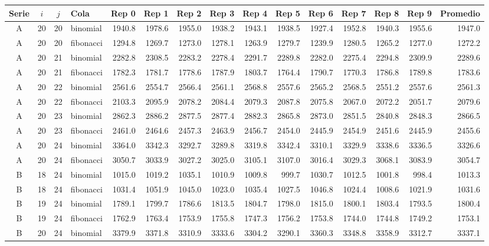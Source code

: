 \begin{tabular}{ccclrrrrrrrrrrr}
\hline
Serie & $i$ & $j$ & Cola & Rep 0 & Rep 1 & Rep 2 & Rep 3 & Rep 4 & Rep 5 & Rep 6 & Rep 7 & Rep 8 & Rep 9 & Promedio \\
\hline
A & 20 & 20 & binomial & 1940.8 & 1978.6 & 1955.0 & 1938.2 & 1943.1 & 1938.5 & 1927.4 & 1952.8 & 1940.3 & 1955.6 & 1947.0 \\
A & 20 & 20 & fibonacci & 1294.8 & 1269.7 & 1273.0 & 1278.1 & 1263.9 & 1279.7 & 1239.9 & 1280.5 & 1265.2 & 1277.0 & 1272.2 \\
A & 20 & 21 & binomial & 2282.8 & 2308.5 & 2283.2 & 2278.4 & 2291.7 & 2289.8 & 2282.0 & 2275.4 & 2294.8 & 2309.9 & 2289.6 \\
A & 20 & 21 & fibonacci & 1782.3 & 1781.7 & 1778.6 & 1787.9 & 1803.7 & 1764.4 & 1790.7 & 1770.3 & 1786.8 & 1789.8 & 1783.6 \\
A & 20 & 22 & binomial & 2561.6 & 2554.7 & 2566.4 & 2561.1 & 2568.8 & 2557.6 & 2565.2 & 2568.5 & 2551.2 & 2557.6 & 2561.3 \\
A & 20 & 22 & fibonacci & 2103.3 & 2095.9 & 2078.2 & 2084.4 & 2079.3 & 2087.8 & 2075.8 & 2067.0 & 2072.2 & 2051.7 & 2079.6 \\
A & 20 & 23 & binomial & 2862.3 & 2886.2 & 2877.5 & 2877.4 & 2882.3 & 2865.8 & 2873.0 & 2851.5 & 2840.8 & 2848.3 & 2866.5 \\
A & 20 & 23 & fibonacci & 2461.0 & 2464.6 & 2457.3 & 2463.9 & 2456.7 & 2454.0 & 2445.9 & 2454.9 & 2451.6 & 2445.9 & 2455.6 \\
A & 20 & 24 & binomial & 3364.0 & 3342.3 & 3292.7 & 3289.8 & 3319.8 & 3342.4 & 3310.1 & 3329.9 & 3338.6 & 3336.5 & 3326.6 \\
A & 20 & 24 & fibonacci & 3050.7 & 3033.9 & 3027.2 & 3025.0 & 3105.1 & 3107.0 & 3016.4 & 3029.3 & 3068.1 & 3083.9 & 3054.7 \\
B & 18 & 24 & binomial & 1015.0 & 1019.2 & 1035.1 & 1010.9 & 1009.8 & 999.7 & 1030.7 & 1012.5 & 1001.8 & 998.4 & 1013.3 \\
B & 18 & 24 & fibonacci & 1031.4 & 1051.9 & 1045.0 & 1023.0 & 1035.4 & 1027.5 & 1046.8 & 1024.4 & 1008.6 & 1021.9 & 1031.6 \\
B & 19 & 24 & binomial & 1789.1 & 1799.7 & 1786.6 & 1813.5 & 1804.7 & 1798.0 & 1815.0 & 1800.1 & 1803.4 & 1793.5 & 1800.4 \\
B & 19 & 24 & fibonacci & 1762.9 & 1763.4 & 1753.9 & 1755.8 & 1747.3 & 1756.2 & 1753.8 & 1744.0 & 1744.8 & 1749.2 & 1753.1 \\
B & 20 & 24 & binomial & 3379.9 & 3371.8 & 3310.9 & 3333.6 & 3304.2 & 3290.1 & 3360.3 & 3348.8 & 3358.9 & 3312.7 & 3337.1 \\

\end{tabular}
